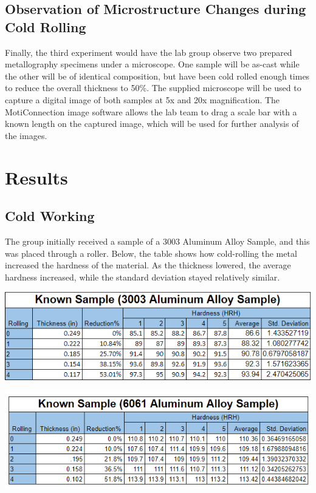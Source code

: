 \documentclass{article}
\begin{document}
\subsection{Observation of Microstructure Changes during Cold Rolling}
\indent Finally, the third experiment would have the lab group observe two prepared metallography specimens under a microscope. One sample will be as-cast while the other will be of identical composition, but have been cold rolled enough times to reduce the overall thickness to 50\%. The supplied microscope will be used to capture a digital image of both samples at 5x and 20x magnification. The MotiConnection image software allows the lab team to drag a scale bar with a known length on the captured image, which will be used for further analysis of the images.

\section{Results}

\subsection{Cold Working}
The group initially received a sample of a 3003 Aluminum Alloy Sample, and this was placed through a roller. Below, the table shows how cold-rolling the metal increased the hardness of the material. As the thickness lowered, the average hardness increased, while the standard deviation stayed relatively similar.

\begin{center}
\includegraphics[width=450pt]{Lab4Data.png}
\end{center}

\begin{center}
\includegraphics[width=450pt]{Lab4Data2.png}
\end{center}
\end{document}

